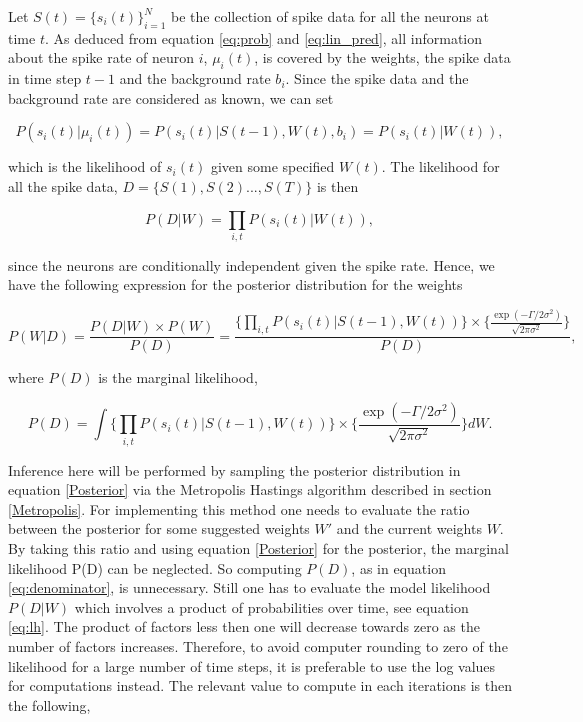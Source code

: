 Let $S(t) = \{s_i(t)\}_{i=1}^N$ be the collection of spike data for all the neurons at time $t$. As deduced from equation \ref{eq:prob} and \ref{eq:lin_pred}, all information about the spike rate of neuron $i$, $\mu_i(t)$, is covered by the weights, the spike data in time step $t-1$ and the background rate $b_i$. Since the spike data and the background rate are considered as known, we can set

\begin{equation}
    P(s_i(t)|\mu_i(t)) = P(s_i(t)|S(t-1),W(t), b_i) = P(s_i(t)|W(t)),
\end{equation}

which is the likelihood of $s_i(t)$ given some specified $W(t)$. The likelihood for all the spike data, $D=\{S(1), S(2)...,S(T)\}$ is then

\begin{equation}
\label{eq:lh}
    P(D|W) = \prod_{i,t} P(s_i(t)|W(t)),
\end{equation}

since the neurons are conditionally independent given the spike rate. Hence, we have the following expression for the posterior distribution for the weights

\begin{equation}
\label{Posterior}
        P(W|D) = \frac{P(D|W)\times P(W)}{P(D)} = \frac{\Big\{\prod_{i,t} P(s_{i}(t)|S(t-1), W(t))\Big\} \times \Big\{\frac{\exp(-\Gamma /2\sigma^2)}{\sqrt{2\pi \sigma^2}}\Big\}}{P(D)}, 
\end{equation}

where $P(D)$ is the marginal likelihood,

\begin{equation}
\label{eq:denominator}
        P(D) = \int \Big\{\prod_{i,t} P(s_{i}(t)|S(t-1), W(t))\Big\} \times \Big\{\frac{\exp(-\Gamma /2\sigma^2)}{\sqrt{2\pi \sigma^2}}\Big\} d{W}.
\end{equation}

Inference here will be performed by sampling the posterior distribution in equation \ref{Posterior} via the Metropolis Hastings algorithm described in section \ref{Metropolis}. For implementing this method one needs to evaluate the  ratio between the posterior for some suggested weights $W'$ and the current weights $W$. By taking this ratio and using equation \ref{Posterior} for the posterior, the marginal likelihood P(D) can be neglected. So computing $P(D)$, as in equation \ref{eq:denominator}, is unnecessary. Still one has to evaluate the model likelihood $P(D|W)$ which involves a product of probabilities over time, see equation \ref{eq:lh}. The product of factors less then one will decrease towards zero as the number of factors increases. Therefore, to avoid computer rounding to zero of the likelihood for a large number of time steps, it is preferable to use the log values for computations instead. The relevant value to compute in each iterations is then the following,

